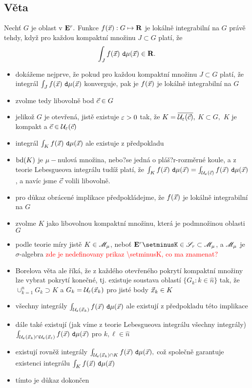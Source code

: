 \subsection{Věta}

Nechť $G$ je oblast v ${{\mathbf E}^r}.$ Funkce $f({\vec{x}}):G\mapsto{\mathbf R}$ je lok\'aln\v e integrabiln\'i na $G$ pr\'av\v e tehdy, kdy\v z pro ka\v zdou kompaktn\'i
mno\v zinu $J\subset G$ plat\'i, \v ze
%
$$\int_{J} f({\vec{x}})~\mathtt{d}\mu({\vec{x}})\in{\mathbf R}.$$

\Proof

\begin{itemize}
\item dokážeme nejprve, že pokud pro každou kompaktní množinu $J\subset G$ platí, že integrál $\int_{J} f({\vec{x}})~\mathtt{d}\mu({\vec{x}})$ konverguje, pak je  $f({\vec{x}})$ je lokálně integrabilní na $G$
\item zvolme tedy libovolně bod $\vec{c}\in G$
\item jelikož $G$ je otevřená, jistě existuje $\varepsilon>0$ tak, že $K=\overline{{\mathcal U}_\varepsilon(\vec{c})},$ $K\subset G,$ $K$ je kompakt  a $\vec{c}\in {\mathcal U}_\varepsilon(\vec{c})$
\item integrál $\int_{K} f({\vec{x}})~\mathtt{d}\mu({\vec{x}})$ ale existuje z předpokladu
\item $\mathrm{bd}(K)$ je $\mu-$nulová množina, nebo?se jedná o pláš?r-rozměrné koule, a z teorie Lebesgueova integrálu tudíž platí, že $\int_{K} f({\vec{x}})~\mathtt{d}\mu({\vec{x}})=\int_{{\mathcal U}_\varepsilon(\vec{c})} f({\vec{x}})~\mathtt{d}\mu({\vec{x}})$, a navíc jsme $\vec{c}$ volili libovolně. 
\item pro důkaz obr\'acen\'e implikace p\v redpokl\'adejme, \v ze  $f({\vec{x}})$ je lok\'aln\v e integrabiln\'i na $G$
\item zvolme $K$ jako libovolnou kompaktn\'i množinu, která je podmno\v zinou oblasti $G$
\item podle teorie m\'iry jist\v e $K\in\mathscr{M}_\mu $, nebo\v t $\Er\setminusK\in\SSS_r\subset\Mmu $, a $\mathscr{M}_\mu$ je $\sigma$-algebra \textcolor{red}{zde je nedefinovany prikaz \textbackslash setminusK, co ma znamenat?}
\item Borelova v\v eta ale \v r\'ik\'a, že z ka\v zd\'eho otev\v ren\'eho pokryt\'i kompaktn\'i mno\v ziny lze vybrat pokryt\'i kone\v cn\'e, tj. existuje soustava oblast\'i $\{G_k: k\in \widehat{n}\}$ tak, \v ze $\cup_{k=1}^n G_k \supset K$ a $G_k={\mathcal U}_{\varepsilon}({\vec{x}}_k)$ pro jist\'e body ${\vec{x}}_k\in K$
\item v\v sechny integr\'aly $\int_{{\mathcal U}_\varepsilon({\vec{x}}_k)} f({\vec{x}})~\mathtt{d}\mu({\vec{x}})$ ale existuj\'i z p\v redpokladu t\'eto implikace
\item d\'ale tak\'e existuj\'i (jak v\'ime z teorie Lebesgueova integr\'alu v\v sechny integr\'aly) $\int_{{\mathcal U}_\varepsilon({\vec{x}}_k)\cap {\mathcal U}_\varepsilon({\vec{x}}_\ell)} f({\vec{x}})~\mathtt{d}\mu({\vec{x}})$ pro $k,\ell\in \widehat{n}$
\item existuj\'i rovn\v e\v z integr\'aly $\int_{{\mathcal U}_\varepsilon({\vec{x}}_k) \cap K} f({\vec{x}})~\mathtt{d}\mu({\vec{x}}),$ co\v z spole\v cn\v e garantuje existenci integrálu $\int_{K} f({\vec{x}})~\mathtt{d}\mu({\vec{x}})$
\item tímto je důkaz dokončen
\end{itemize}

